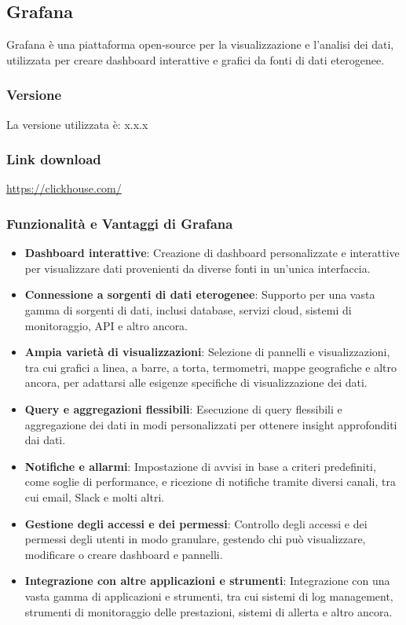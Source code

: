 \subsection{Grafana}
Grafana è una piattaforma open-source per la visualizzazione e l'analisi dei dati, utilizzata per creare dashboard interattive e grafici da fonti di dati eterogenee. 
\subsubsection{Versione}
La versione utilizzata è: x.x.x
\subsubsection{Link download}
\href{https://clickhouse.com/}{https://clickhouse.com/}

\subsubsection{Funzionalità e Vantaggi di Grafana}
\begin{itemize}
    \item \textbf{Dashboard interattive}: Creazione di dashboard personalizzate e interattive per visualizzare dati provenienti da diverse fonti in un'unica interfaccia.
    
    \item \textbf{Connessione a sorgenti di dati eterogenee}: Supporto per una vasta gamma di sorgenti di dati, inclusi database, servizi cloud, sistemi di monitoraggio, API e altro ancora.
    
    \item \textbf{Ampia varietà di visualizzazioni}: Selezione di pannelli e visualizzazioni, tra cui grafici a linea, a barre, a torta, termometri, mappe geografiche e altro ancora, per adattarsi alle esigenze specifiche di visualizzazione dei dati.
    
    \item \textbf{Query e aggregazioni flessibili}: Esecuzione di query flessibili e aggregazione dei dati in modi personalizzati per ottenere insight approfonditi dai dati.
    
    \item \textbf{Notifiche e allarmi}: Impostazione di avvisi in base a criteri predefiniti, come soglie di performance, e ricezione di notifiche tramite diversi canali, tra cui email, Slack e molti altri.
    
    \item \textbf{Gestione degli accessi e dei permessi}: Controllo degli accessi e dei permessi degli utenti in modo granulare, gestendo chi può visualizzare, modificare o creare dashboard e pannelli.
    
    \item \textbf{Integrazione con altre applicazioni e strumenti}: Integrazione con una vasta gamma di applicazioni e strumenti, tra cui sistemi di log management, strumenti di monitoraggio delle prestazioni, sistemi di allerta e altro ancora.
    
   \end{itemize}
